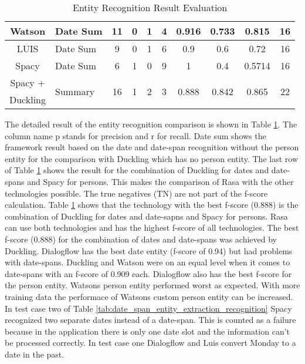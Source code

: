 \begin{table}[h]
\begin{tabular}{ c | l | c | c | c | c | c | c | c | c }
        Watson & Date Sum & 11 & 0 & 1 & 4 & 0.916 & 0.733 & 0.815 & 16 \\ \hline
        LUIS & Date Sum & 9 & 0 & 1 & 6 & 0.9 & 0.6 & 0.72 & 16 \\ \hline
        Spacy & Date Sum & 6 & 1 & 0 & 9 & 1 & 0.4 & 0.5714 & 16 \\ \hline
        Spacy + & \multirow{2}{*}{Summary} & \multirow{2}{*}{16} & \multirow{2}{*}{1} & \multirow{2}{*}{2} & \multirow{2}{*}{3} & \multirow{2}{*}{0.888} & \multirow{2}{*}{0.842} & \multirow{2}{*}{0.865} & \multirow{2}{*}{22} \\
        Duckling & & & & & & & & & \\\hline
    \end{tabular}
    \caption{Entity Recognition Result Evaluation} \label{tab:entity_extraction_eval}
\end{table} \noindent
The detailed result of the entity recognition comparison is shown in Table \ref{tab:entity_extraction_eval}.
The column name p stands for precision and r for recall.
Date sum shows the framework result based on the date and date-span recognition
without the person entity for the comparison with Duckling which has no person entity.
The last row of Table \ref{tab:entity_extraction_eval} shows the result for the combination 
of Duckling for dates and date-spans and Spacy for persons.
This makes the comparison of Rasa with the other technologies possible.
The true negatives (TN) are not part of the f-score calculation.
Table \ref{tab:entity_extraction_eval} shows that the technology with the 
best f-score (0.888) is the combination of Duckling for dates and date-sapns and Spacy  
for persons.
Rasa can use both technologies and has the highest f-score of all technologies.
The best f-score (0.888) for the combination of dates and date-spans was achieved  
by Duckling.
Dialogflow has the best date entity (f-score of 0.94) but had problems 
with date-spans.
Duckling and Watson were on an equal level when it comes to date-spans 
with an f-score of 0.909 each.
Dialogflow also has the best f-score for the person entity.
Watsons person entity performed worst as expected.
With more training data the performace of Watsons custom person 
entity can be increased.
In test case two of Table \ref{tab:date_span_entity_extraction_recognition} Spacy 
recognized two separate dates instead of a date-span.
This is counted as a failure because in the application there is only one date slot
and the information can't be processed correctly.
In test case one Dialogflow and Luis convert Monday to a date in the past.
